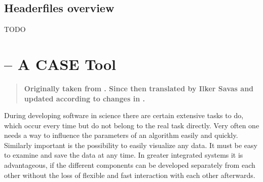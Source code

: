 \section{Headerfiles overview}
\label{sec:headerfiles}

TODO


\chapter{\icewing{} -- A CASE Tool}

\begin{quote}
  \textbf{Originally taken from \cite[Anhang B]{Loemker2004-LVO}.
    Since then translated by Ilker Savas and updated according to
    changes in \icewing{}.}
\end{quote}

\label{chap:p_icewing}

During developing software in science there are certain extensive
tasks to do, which occur every time but do not belong to the real
task directly. Very often one needs a way to influence the
parameters of an algorithm easily and quickly. Similarly important
is the possibility to easily visualize any data. It must be easy to
examine and save the data at any time. In greater integrated systems
it is advantageous, if the different components can be developed
separately from each other without the loss of flexible and fast
interaction with each other afterwards.

